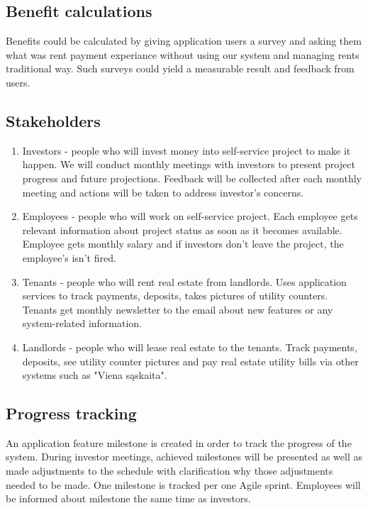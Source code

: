 \documentclass{VUMIFPSkursinis}
\begin{document}
	\subsection{Benefit calculations}
		Benefits could be calculated by giving application users a survey and asking them what was rent payment experiance without using our system and managing rents traditional way.
		Such surveys could yield a measurable result and feedback from users.

	\subsection{Stakeholders}
		\begin{enumerate}
			\item{Investors - people who will invest money into self-service project to make it happen. 
				We will conduct monthly meetings with investors to present project progress and future projections.
				Feedback will be collected after each monthly meeting and actions will be taken to address investor's concerns.}
			\item{Employees - people who will work on self-service project.
				Each employee gets relevant information about project status as soon as it becomes available.
				Employee gets monthly salary and if investors don't leave the project, the employee's isn't fired.}
			\item{Tenants - people who will rent real estate from landlords.
					Uses application services to track payments, deposits, takes pictures of utility counters.
					Tenants get monthly newsletter to the email about new features or any system-related information.}
			\item{Landlords - people who will lease real estate to the tenants.
					Track payments, deposits, see utility counter pictures and pay real estate utility bills via other systems such as "Viena sąskaita".}
		\end{enumerate}

	\subsection{Progress tracking}
		An application feature milestone is created in order to track the progress of the system.
		During investor meetings, achieved milestones will be presented as well as made adjustments to the schedule with clarification why those adjustments needed to be made.
		One milestone is tracked per one Agile sprint.
		Employees will be informed about milestone the same time as investors.
\end{document}
